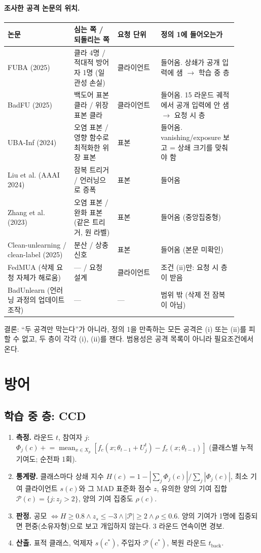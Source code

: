 \documentclass[10pt,a4paper]{article}
\newcommand{\method}{CCD}
\begin{document}
\paragraph{조사한 공격 논문의 위치.}
\begin{center}\small
\begin{tabular}{p{0.26\linewidth}p{0.17\linewidth}p{0.17\linewidth}p{0.3\linewidth}}\toprule
논문 & 심는 쪽 / 되돌리는 쪽 & 요청 단위 & 정의 1에 들어오는가 \\\midrule
FUBA (2025) & 클라 4명 / 적대적 방어자 1명 (일관성 손실) & 클라이언트 & 들어옴. 상쇄가 공개 입력에 샘 $\to$ 학습 중 층 \\
BadFU (2025) & 백도어 표본 클라 / 위장 표본 클라 & 클라이언트 & 들어옴. 15 라운드 궤적에서 공개 입력에 안 샘 $\to$ 요청 시 층 \\
UBA-Inf (2024) & 오염 표본 / 영향 함수로 최적화한 위장 표본 & 표본 & 들어옴. vanishing/exposure 보고 = 상쇄 크기를 맞춰야 함 \\
Liu et al. (AAAI 2024) & 잠복 트리거 / 언러닝으로 증폭 & 표본 & 들어옴 \\
Zhang et al. (2023) & 오염 표본 / 완화 표본 (같은 트리거, 원 라벨) & 표본 & 들어옴 (중앙집중형) \\
Clean-unlearning / clean-label (2025) & 분산 / 상충 신호 & 표본 & 들어옴 (본문 미확인) \\
FedMUA (삭제 요청 자체가 해로움) & --- / 요청 설계 & 클라이언트 & 조건 (ii)만: 요청 시 층이 받음 \\
BadUnlearn (언러닝 과정의 업데이트 조작) & --- & --- & 범위 밖 (삭제 전 잠복이 아님) \\
\bottomrule\end{tabular}
\end{center}
결론: ``두 공격만 막는다''가 아니라, 정의 1을 만족하는 모든 공격은 (i) 또는 (ii)를 피할 수 없고, 두 층이 각각 (i), (ii)를 잰다. 범용성은 공격 목록이 아니라 필요조건에서 온다.

\section{방어}
\subsection{학습 중 층: \method{}}
\begin{enumerate}
\item \textbf{측정.} 라운드 $t$, 참여자 $j$: $\Phi_j(c)\mathrel{+}=\operatorname{mean}_{x\in X_p}[f_c(x;\theta_{t-1}+U_j^t)-f_c(x;\theta_{t-1})]$ (클래스별 누적 기여도; 순전파 1회).
\item \textbf{통계량.} 클래스마다 상쇄 지수 $H(c)=1-|\sum_j\Phi_j(c)|/\sum_j|\Phi_j(c)|$, 최소 기여 클라이언트 $s(c)$와 그 MAD 표준화 점수 $z$, 유의한 양의 기여 집합 $\mathcal{P}(c)=\{j: z_j>2\}$, 양의 기여 집중도 $\rho(c)$.
\item \textbf{판정.} 공모 $\Leftrightarrow H\ge0.8 \wedge z_{s}\le-3 \wedge |\mathcal{P}|\ge2 \wedge \rho\le0.6$. 양의 기여가 1명에 집중되면 편중(소유자형)으로 보고 개입하지 않는다. 3 라운드 연속이면 경보.
\item \textbf{산출.} 표적 클래스, 억제자 $s(c^*)$, 주입자 $\mathcal{P}(c^*)$, 복원 라운드 $t_{\mathrm{back}}$.
\end{enumerate}
\end{document}
